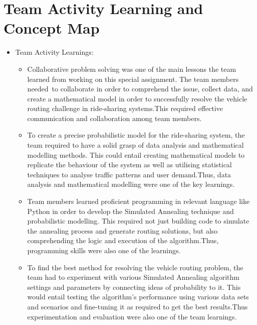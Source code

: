 \documentclass{article}
\begin{document}
\section{Team Activity Learning and Concept Map}
\begin{itemize}
    \large
    \item Team Activity Learnings:\\
    \begin{itemize}
        \item Collaborative problem solving was one of the main lessons the team learned from working on this special assignment. The team members needed to collaborate in order to comprehend the issue, collect data, and create a mathematical model in order to successfully resolve the vehicle routing challenge in ride-sharing systems.This required effective communication and collaboration among team members. \\
        \item To create a precise probabilistic model for the ride-sharing system, the team required to have a solid grasp of data analysis and mathematical modelling methods. This could entail creating mathematical models to replicate the behaviour of the system as well as utilising statistical techniques to analyse traffic patterns and user demand.Thus, data analysis and mathematical modelling were one of the key learnings.\\
        \item Team members learned proficient programming in  relevant language like Python in order to develop the Simulated Annealing technique and probabilistic modelling. This required not just building code to simulate the annealing process and generate routing solutions, but also comprehending the logic and execution of the algorithm.Thus, programming skills were also one of the learnings.\\

        \newpage
        \item To find the best method for resolving the vehicle routing problem, the team had to experiment with various Simulated Annealing algorithm settings and parameters by connecting ideas of probability to it. This would entail testing the algorithm's performance using various data sets and scenarios and fine-tuning it as required to get the best results.Thus experimentation and evaluation were also one of the team learnings.\\
    \end{itemize} \\


\end{itemize}
\end{document}
